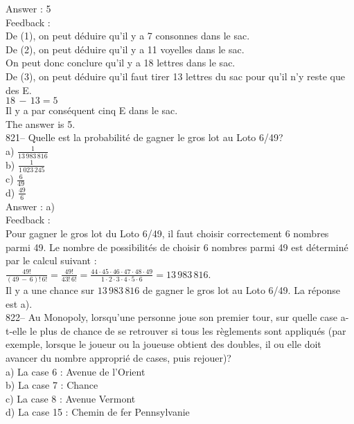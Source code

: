 \documentclass[letterpaper, 12pt]{article}
\begin{document}
Answer : 5\\

Feedback : \\
De (1), on peut d\'eduire qu'il y a 7 consonnes dans le sac.\\
De (2), on peut d\'eduire qu'il y a 11 voyelles dans le sac.\\
On peut donc conclure qu'il y a 18 lettres dans le sac.\\
De (3), on peut d\'eduire qu'il faut tirer 13 lettres du sac pour qu'il n'y
reste que des E.  \\
$18\,-\,13=5$\\
Il y a par cons\'equent cinq E dans le sac.\\
The answer is 5.\\


821-- Quelle est la probabilit\'e de gagner le gros lot au Loto 6/49?\\
a) $\frac{1}{13\,983\,816}$\\ [2mm] b) $\frac{1}{1\,023\,245}$\\
[2mm] c) $\frac{6}{49}$\\ [2mm]
d) $\frac{49}{6}$\\

Answer : a)\\

Feedback : \\
Pour gagner le gros lot du Loto 6/49, il faut choisir correctement 6 nombres
parmi 49.  Le nombre de possibilit\'es de choisir 6 nombres parmi 49 est
d\'etermin\'e par le calcul suivant :\\[2mm]
$\frac{49!}{\left( 49\,-\,6\right)
!\,6!}=\frac{49!}{43!\,6!}=\frac{44\cdot45\cdot46\cdot47\cdot48\cdot49}{1\cdot2\cdot3\cdot4\cdot5\cdot6}=13\,983\,816$.\\[2mm]
Il y a une chance sur $13\,983\,816$ de gagner le gros lot au Loto 6/49.  La
r\'eponse est a).\\

822-- Au Monopoly, lorsqu'une personne joue son premier tour, sur quelle
case a-t-elle le plus de chance de se retrouver si tous les r\`eglements
sont appliqu\'es (par exemple, lorsque le joueur ou la joueuse obtient des
doubles, il ou elle doit avancer du nombre appropri\'e de cases, puis
rejouer)?\\
a) La case 6 : Avenue de l'Orient\\
b) La case 7 : Chance\\
c) La case 8 : Avenue Vermont\\
d) La case 15 : Chemin de fer Pennsylvanie\\
\end{document}
